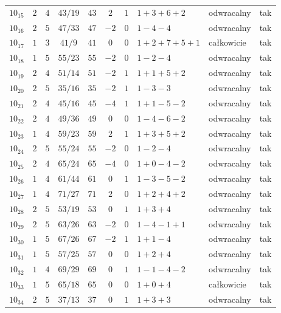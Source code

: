 \begin{longtable}{lccccccllc}
$10_{15}$  & $2$   & $4$ & $43/19$ & $43$  & $2$  & $1$ & $1+3+6+2$     & odwracalny & tak \\
$10_{16}$  & $2$   & $5$ & $47/33$ & $47$  & $-2$ & $0$ & $1-4-4$       & odwracalny & tak \\
$10_{17}$  & $1$   & $3$ & $41/9$ & $41$  & $0$  & $0$ & $1+2+7+5+1$   & całkowicie & tak \\
$10_{18}$  & $1$   & $5$ & $55/23$ & $55$  & $-2$ & $0$ & $1-2-4$       & odwracalny & tak \\
$10_{19}$  & $2$   & $4$ & $51/14$ & $51$  & $-2$ & $1$ & $1+1+5+2$     & odwracalny & tak \\
$10_{20}$  & $2$   & $5$ & $35/16$ & $35$  & $-2$ & $1$ & $1-3-3$       & odwracalny & tak \\
$10_{21}$  & $2$   & $4$ & $45/16$ & $45$  & $-4$ & $1$ & $1+1-5-2$     & odwracalny & tak \\
$10_{22}$  & $2$   & $4$ & $49/36$ & $49$  & $0$  & $0$ & $1-4-6-2$     & odwracalny & tak \\
$10_{23}$  & $1$   & $4$ & $59/23$ & $59$  & $2$  & $1$ & $1+3+5+2$     & odwracalny & tak \\
$10_{24}$  & $2$   & $5$ & $55/24$ & $55$  & $-2$ & $0$ & $1-2-4$       & odwracalny & tak \\
$10_{25}$  & $2$   & $4$ & $65/24$ & $65$  & $-4$ & $0$ & $1+0-4-2$     & odwracalny & tak \\
$10_{26}$  & $1$   & $4$ & $61/44$ & $61$  & $0$  & $1$ & $1-3-5-2$     & odwracalny & tak \\
$10_{27}$  & $1$   & $4$ & $71/27$ & $71$  & $2$  & $0$ & $1+2+4+2$     & odwracalny & tak \\
$10_{28}$  & $2$   & $5$ & $53/19$ & $53$  & $0$  & $1$ & $1+3+4$       & odwracalny & tak \\
$10_{29}$  & $2$   & $5$ & $63/26$ & $63$  & $-2$ & $0$ & $1-4-1+1$     & odwracalny & tak \\
$10_{30}$  & $1$   & $5$ & $67/26$ & $67$  & $-2$ & $1$ & $1+1-4$       & odwracalny & tak \\
$10_{31}$  & $1$   & $5$ & $57/25$ & $57$  & $0$  & $0$ & $1+2+4$       & odwracalny & tak \\
$10_{32}$  & $1$   & $4$ & $69/29$ & $69$  & $0$  & $1$ & $1-1-4-2$     & odwracalny & tak \\
$10_{33}$  & $1$   & $5$ & $65/18$ & $65$  & $0$  & $0$ & $1+0+4$       & całkowicie & tak \\
$10_{34}$  & $2$   & $5$ & $37/13$ & $37$  & $0$  & $1$ & $1+3+3$       & odwracalny & tak \\

\end{longtable}

